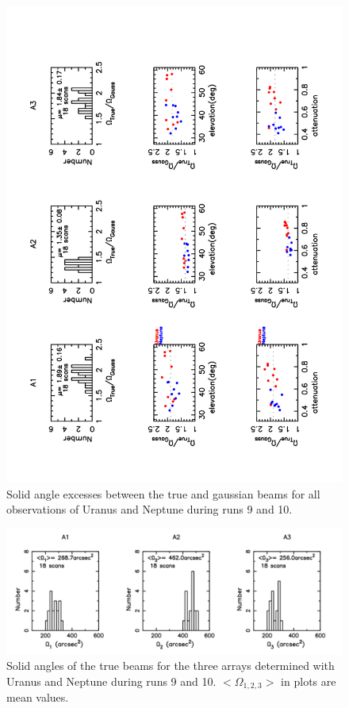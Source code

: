 \begin{figure}
\begin{center}
  \includegraphics[clip,angle=-90, scale=0.6]{Figures/TG_hist_runs_9_10.pdf}
  \caption{Solid angle excesses between the true and  gaussian beams for all
   observations of Uranus and Neptune during runs 9 and 10.}
\label{hist:excesses}
\end{center}
\end{figure}

\begin{figure}
\begin{center}
  \includegraphics[clip,angle=0, scale=0.5]{Figures/Omega_arcsec2.png}
  \caption{Solid angles of the  true  beams for the three arrays determined
    with Uranus and Neptune during runs 9 and 10. $<\Omega_{1,2,3}>$ in plots are mean values.}
\label{fig:Omega_arcsec2}
\end{center}
\end{figure}




